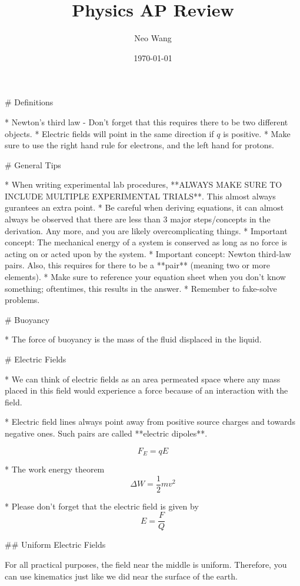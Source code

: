 \documentclass{article}
\title{Physics AP Review}
\author{Neo Wang}
\date{\today}
\begin{document}
\maketitle
\tableofcontents

\begin{markdown}

# Definitions

* Newton's third law - Don't forget that this requires there to be two different objects.
* Electric fields will point in the same direction if $q$ is positive.
* Make sure to use the right hand rule for electrons, and the left hand for protons.

# General Tips

* When writing experimental lab procedures, **ALWAYS MAKE SURE TO INCLUDE MULTIPLE EXPERIMENTAL TRIALS**. This almost always gurantees an extra point.
* Be careful when deriving equations, it can almost always be observed that there are less than 3 major steps/concepts in the derivation. Any more, and you are likely overcomplicating things.
* Important concept: The mechanical energy of a system is conserved as long as no force is acting on or acted upon by the system.
* Important concept: Newton third-law pairs. Also, this requires for there to be a **pair** (meaning two or more elements).
* Make sure to reference your equation sheet when you don't know something; oftentimes, this results in the answer.
* Remember to fake-solve problems.

# Buoyancy

* The force of buoyancy is the mass of the fluid displaced in the liquid.

# Electric Fields

* We can think of electric fields as an area permeated space where any mass placed in this field would experience a force because of an interaction with the field.

* Electric field lines always point away from positive source charges and towards negative ones. Such pairs are called **electric dipoles**.

$$
F_E = qE
$$

* The work energy theorem $$\Delta W = \frac{1}{2}mv^2$$

* Please don't forget that the electric field is given by $$E = \frac{F}{Q}$$

## Uniform Electric Fields

For all practical purposes, the field near the middle is uniform. Therefore, you can use kinematics just like we did near the surface of the earth.


\end{markdown}
\end{document}
